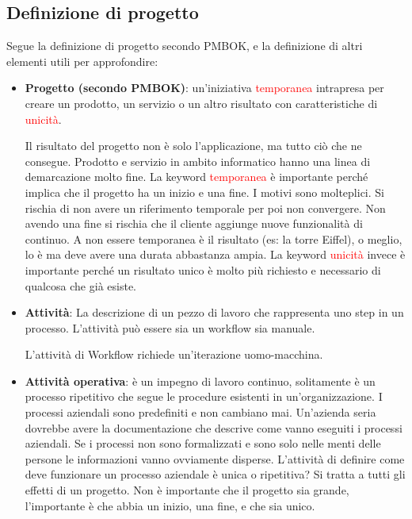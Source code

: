 \subsection{Definizione di progetto}
Segue la definizione di progetto secondo PMBOK, e la definizione di altri elementi utili per approfondire:
\begin{itemize}
	\item \textbf{Progetto (secondo PMBOK)}: un'iniziativa \textcolor{red}{temporanea} intrapresa per creare un prodotto, un servizio o un altro risultato con caratteristiche di \textcolor{red}{unicità}.
	\begin{info}
		Il risultato del progetto non è solo l'applicazione, ma tutto ciò che ne consegue. Prodotto e servizio in ambito informatico hanno una linea di demarcazione molto fine.\newline
		La keyword \textcolor{red}{temporanea} è importante perché implica che il progetto ha un inizio e una fine. I motivi sono molteplici. Si rischia di non avere un riferimento temporale per poi non convergere. Non avendo una fine si rischia che il cliente aggiunge nuove funzionalità di continuo. A non essere temporanea è il risultato (es: la torre Eiffel), o meglio, lo è ma deve avere una durata abbastanza ampia.\newline
		La keyword \textcolor{red}{unicità} invece è importante perché un risultato unico è molto più richiesto e necessario di qualcosa che già esiste.\newline
	\end{info}
	\item \textbf{Attività}: La descrizione di un pezzo di lavoro che rappresenta uno step in un processo. L'attività può essere sia un workflow sia manuale. 
	\begin{info}
		L'attività di Workflow richiede un'iterazione uomo-macchina.
	\end{info}
	\item \textbf{Attività operativa}: è un impegno di lavoro continuo, solitamente è un processo ripetitivo che segue le procedure esistenti in un'organizzazione. I processi aziendali sono predefiniti e non cambiano mai. Un'azienda seria dovrebbe avere la documentazione che descrive come vanno eseguiti i processi aziendali. Se i processi non sono formalizzati e sono solo nelle menti delle persone le informazioni vanno ovviamente disperse.\newline\newline
	L'attività di definire come deve funzionare un processo aziendale è unica o ripetitiva? Si tratta a tutti gli effetti di un progetto. Non è importante che il progetto sia grande, l'importante è che abbia un inizio, una fine, e che sia unico.

\end{itemize}
